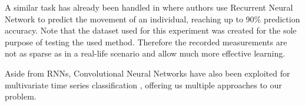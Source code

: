 %	
%	
%	
\bigskip
A similar task has already been handled in \cite{PredictingUserMovements} where authors use Recurrent Neural Network to predict the movement of an individual, reaching up to 90\% prediction accuracy. Note that the dataset used for this experiment was created for the sole purpose of testing the used method. Therefore the recorded measurements are not as sparse as in a real-life scenario and allow much more effective learning.\\

\par
Aside from RNNs, Convolutional Neural Networks have also been exploited for multivariate time series classification \cite{CNNTimeSeriesPred, Yang2015DeepCN}, offering us multiple approaches to our problem.\\

